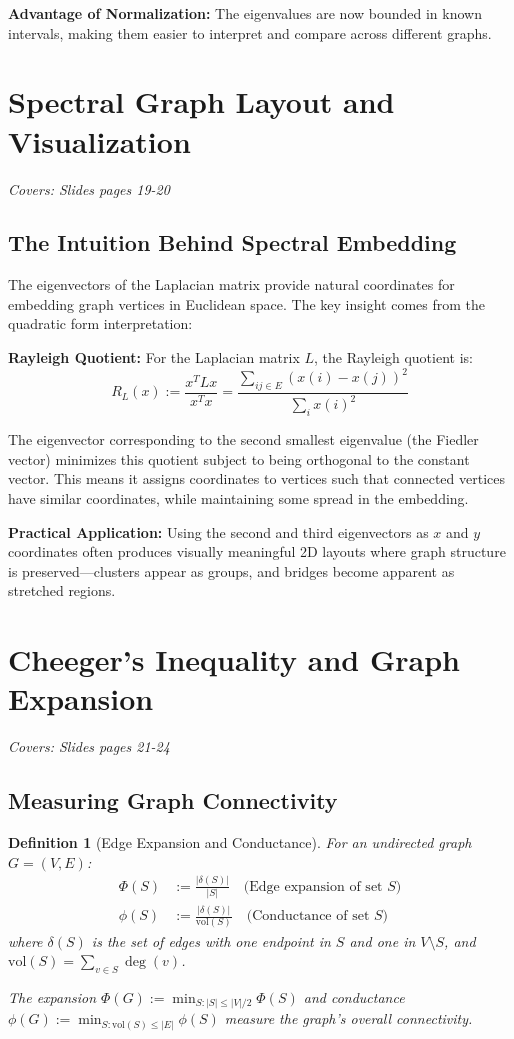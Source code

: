 \documentclass[11pt]{article}
\newtheorem{definition}{Definition}
\begin{document}
\textbf{Advantage of Normalization:} The eigenvalues are now bounded in known intervals, making them easier to interpret and compare across different graphs.

\section{Spectral Graph Layout and Visualization}
\textit{Covers: Slides pages 19-20}

\subsection{The Intuition Behind Spectral Embedding}
The eigenvectors of the Laplacian matrix provide natural coordinates for embedding graph vertices in Euclidean space. The key insight comes from the quadratic form interpretation:

\textbf{Rayleigh Quotient:} For the Laplacian matrix $L$, the Rayleigh quotient is:
$$R_L(x) := \frac{x^T L x}{x^T x} = \frac{\sum_{ij \in E} (x(i) - x(j))^2}{\sum_i x(i)^2}$$

The eigenvector corresponding to the second smallest eigenvalue (the Fiedler vector) minimizes this quotient subject to being orthogonal to the constant vector. This means it assigns coordinates to vertices such that connected vertices have similar coordinates, while maintaining some spread in the embedding.

\textbf{Practical Application:} Using the second and third eigenvectors as $x$ and $y$ coordinates often produces visually meaningful 2D layouts where graph structure is preserved—clusters appear as groups, and bridges become apparent as stretched regions.

\section{Cheeger's Inequality and Graph Expansion}
\textit{Covers: Slides pages 21-24}

\subsection{Measuring Graph Connectivity}

\begin{definition}[Edge Expansion and Conductance]
For an undirected graph $G = (V,E)$:
\begin{align}
\Phi(S) &:= \frac{|\delta(S)|}{|S|} \quad \text{(Edge expansion of set $S$)}\\
\phi(S) &:= \frac{|\delta(S)|}{\text{vol}(S)} \quad \text{(Conductance of set $S$)}
\end{align}
where $\delta(S)$ is the set of edges with one endpoint in $S$ and one in $V \setminus S$, and $\text{vol}(S) = \sum_{v \in S} \deg(v)$.

The expansion $\Phi(G) := \min_{S:|S| \leq |V|/2} \Phi(S)$ and conductance $\phi(G) := \min_{S:\text{vol}(S) \leq |E|} \phi(S)$ measure the graph's overall connectivity.
\end{definition}
\end{document}
